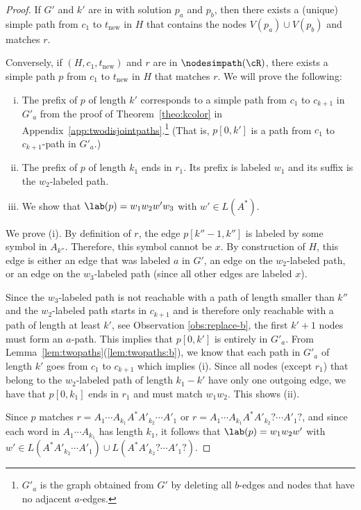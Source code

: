 \documentclass[a4paper,english]{lipics-v2016}
\theoremstyle{plain}
\begin{document}
\begin{proof}
  If $G'$ and $k'$ are in \knodecolordisjointpaths with solution $p_a$ and
  $p_b$, then there exists a (unique) simple path from $c_1$ to $t_\text{new}$ in $H$ that contains the nodes
  $V(p_a) \cup V(p_b)$ and matches $r$. 

  Conversely, if $(H,c_1,t_\text{new})$ and $r$ are in $\nodesimpath(\cR)$, there
  exists a simple path $p$ from $c_1$ to $t_\text{new}$ in $H$ that matches $r$. We will
  prove the following:
  \begin{enumerate}[(i)]
  \item The prefix of $p$ of length $k'$ corresponds to a simple path
    from $c_1$  to $c_{k+1}$ in $G'_a$ from the proof of
    Theorem~\ref{theo:kcolor} in
    Appendix~\ref{app:twodisjointpaths}.\footnote{$G'_a$ is the graph
      obtained from $G'$ by deleting all $b$-edges and nodes that have no adjacent $a$-edges.} (That is, $p[0,k']$ is a path
    from $c_1$ to $c_{k+1}$-path in $G'_a$.) 
  \item The prefix of $p$ of length $k_1$ ends in $r_1$. Its prefix
    is labeled $w_1$ and its suffix is the $w_2$-labeled path.
  \item We show that $\lab(p)=w_1w_2 w' w_3$ with $w' \in L(A^*)$. 
     \end{enumerate}
   We prove (i). By definition of $r$, the edge $p[k''-1,k'']$ is
  labeled by some symbol in $A_{k''}$. Therefore, this symbol cannot
  be $x$. By construction of $H$, this edge is either an edge that was
  labeled $a$ in $G'$, an edge on the $w_2$-labeled path, or an edge
  on the $w_3$-labeled path (since all other edges are labeled $x$).
  
  Since the $w_3$-labeled path is not reachable with a path of length
  smaller than $k''$ and the $w_2$-labeled path starts in $c_{k+1}$
  and is therefore only reachable with a path of length at least $k'$,
  see Observation \ref{obs:replace-b}, the first $k'+1$ nodes must
  form an $a$-path. This implies that $p[0,k']$ is entirely in
  $G'_a$. 
 From
  Lemma~\ref{lem:twopaths}(\ref{lem:twopaths:b}), we know that each
  path in $G'_a$ of length $k'$ goes from $c_1$ to $c_{k+1}$ which implies (i).
Since all nodes (except $r_1$) that belong to the $w_2$-labeled path of length $k_1-k'$ have only one outgoing edge, we have that $p[0,k_1]$ ends in $r_1$ and must match $w_1w_2$. This shows (ii).

Since $p$ matches $r=A_1 \cdots A_{k_1} A^* A'_{k_2} \cdots A'_1$ or
$r=A_1 \cdots A_{k_1} A^* A'_{k_2}? \cdots A'_1?$, and since each word
in $A_1 \cdots A_{k_1}$ has length $k_1$, it follows that $\lab(p)=w_1
w_2 w'$ with $w' \in L(A^* A'_{k_2} \cdots \allowbreak A'_1) \cup L(A^* A'_{k_2}? \cdots A'_1?)$.


\end{proof}
\end{document}
